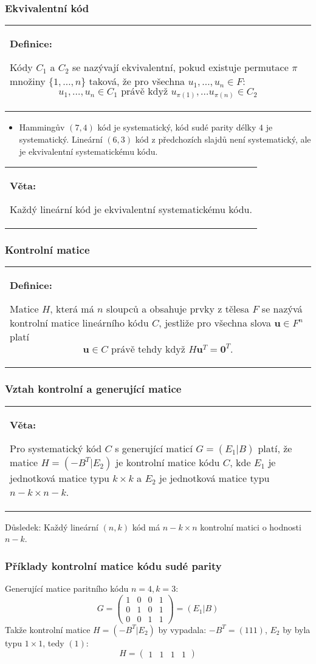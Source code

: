\documentclass{beamer}
\newenvironment{definice}
{
    \begin{center}
    \begin{tabular}{p{9cm}}
    \textbf{Definice:}
}
{
    \end{tabular}
    \end{center}
}
\newenvironment{veta}
{
    \begin{center}
    \begin{tabular}{p{9cm}}
    \textbf{Věta:}
}
{
    \end{tabular}
    \end{center}
}
\newcommand{\vu}{\textbf{u}}
\newenvironment{itemizex}%
  {\large \begin{itemize}%
    \setlength{\itemsep}{8pt}%
    \setlength{\parskip}{8pt}}%
  {\end{itemize}}
\begin{document}
\begin{frame}[t,fragile]\frametitle{Ekvivalentní kód} 
\begin{definice}
Kódy $C_1$ a $C_2$ se nazývají ekvivalentní, pokud existuje permutace $\pi$ množiny $\{1,\dots,n\}$ taková, že pro všechna $u_1,\dots,u_n\in F$:
$$
u_1,\dots,u_n\in C_1 \mbox{ právě když } u_{\pi(1)},\dots u_{\pi(n)} \in C_2
$$
\end{definice}

\begin{itemizex}
    \item Hammingův $(7,4)$ kód je systematický, kód sudé parity délky $4$ je systematický. Lineární $(6,3)$ kód z předchozích slajdů není systematický, ale je ekvivalentní systematickému kódu. 
\end{itemizex}

\begin{veta}
Každý lineární kód je ekvivalentní systematickému kódu. 
\end{veta}
\end{frame}


\begin{frame}[t,fragile]\frametitle{Kontrolní matice} 
    \begin{definice}
        Matice $H$, která má $n$ sloupců a obsahuje prvky z tělesa $F$ se nazývá kontrolní matice lineárního kódu $C$, jestliže pro všechna slova $\vu\in F^n$ platí
        $$
        \vu\in C \mbox{ právě tehdy když } H\vu^T=\textbf{0}^T.
        $$
    \end{definice}
\end{frame}


\begin{frame}[t,fragile]\frametitle{Vztah kontrolní a generující matice} 
    \begin{veta}
        Pro systematický kód $C$ s generující maticí $G=(E_1|B)$ platí, že matice $H=(-B^T|E_2)$ je kontrolní matice kódu $C$, kde $E_1$ je jednotková matice typu $k\times k$ a $E_2$ je jednotková matice typu $n-k\times n-k$.
    \end{veta}

    Důsledek: Každý lineární $(n,k)$ kód má $n-k\times n$ kontrolní matici o hodnosti $n-k$.
\end{frame}




\begin{frame}[t,fragile]\frametitle{Příklady kontrolní matice kódu sudé parity} 
Generující matice paritního kódu $n=4, k=3$:
$$
G=
\begin{pmatrix}
1&0&0&1\\
0&1&0&1\\
0&0&1&1
\end{pmatrix}
=(E_1|B)
$$
Takže kontrolní matice $H=(-B^T|E_2)$ by vypadala: $-B^T=(111)$, $E_2$ by byla typu $1\times1$, tedy $(1)$:
$$
H=
\begin{pmatrix}
1&1&1&1
\end{pmatrix}
$$
\end{frame}
\end{document}
